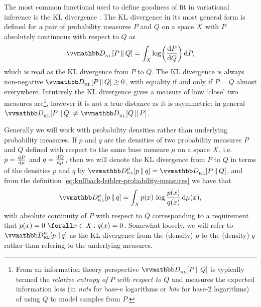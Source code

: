 The most common functional used to define goodness of fit in variational inference is the \ac{KL} divergence \citep{kullback1951information}. The \ac{KL} divergence in its most general form is defined for a pair of probability measures $P$ and $Q$ on a space $\mathit{X}$ with $P$ absolutely continuous with respect to $Q$ as
\begin{equation}\label{eq:kullback-leibler-probability-measures}
  \kldiv{P}{Q} =
  \int_{\set{X}} \log\lpa\td{P}{Q}\rpa \,\dr P,
\end{equation}
which is read as the \ac{KL} divergence from $P$ to $Q$. The \ac{KL} divergence is always non-negative $\kldiv{P}{Q} \geq 0$, with equality if and only if $P = Q$ almost everywhere. Intutively the \ac{KL} divergence gives a measure of how `close' two measures are\footnote{From an information theory perspective $\kldiv{P}{Q}$ is typically termed the \emph{relative entropy of $P$ with respect to $Q$} and measures the expected information loss (in \emph{nats} for base-$\mathrm{e}$ logarithms or \emph{bits} for base-2 logarithms) of using $Q$ to model samples from $P$.}, however it is not a true distance as it is asymmetric: in general $\kldiv{P}{Q} \neq \kldiv{Q}{P}$.

Generally we will work with probability densities rather than underlying probability measures. If $p$ and $q$ are the densities of two probability measures $P$ and $Q$ defined with respect to the same base measure $\mu$ on a space $\mathit{X}$, i.e. $p = \frac{\mathrm{d} P}{\mathrm{d} \mu}$ and $q = \frac{\mathrm{d} Q}{\mathrm{d} \mu}$, then we will denote the \ac{KL} divergence from $P$ to $Q$ in terms of the densities $p$ and $q$ by $\kldiv[\mu]{p}{q} = \kldiv{P}{Q}$, and from the definition \eqref{eq:kullback-leibler-probability-measures} we have that
\begin{equation}\label{eq:kullback-leibler-probability-densities}
  \kldiv[\mu]{p}{q} =
  \int_{\set{X}} p(x) \, \log\frac{p(x)}{q(x)} \, \dr\mu(x),
\end{equation}
with absolute continuity of $P$ with respect to $Q$ corresponding to a requirement that $p(x) = 0 ~\forall x \in \set{X} : q(x) = 0$. Somewhat loosely, we will refer to $\kldiv[\mu]{p}{q}$ as the \ac{KL} divergence from the (density) $p$ to the (density) $q$ rather than refering to the underlying measures.

